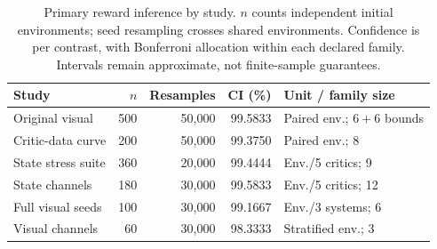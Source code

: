 \begin{table}[tb]\centering\small
\caption{Primary reward inference by study. $n$ counts independent initial environments; seed resampling crosses shared environments. Confidence is per contrast, with Bonferroni allocation within each declared family. Intervals remain approximate, not finite-sample guarantees.}\label{tab:inference}
\setlength{\tabcolsep}{3pt}
\begin{tabular}{lrrrl}\toprule Study & $n$ & Resamples & CI (\%) & Unit / family size\\\midrule
Original visual & 500 & 50,000 & 99.5833 & Paired env.; $6+6$ bounds\\
Critic-data curve & 200 & 50,000 & 99.3750 & Paired env.; 8\\
State stress suite & 360 & 20,000 & 99.4444 & Env./5 critics; 9\\
State channels & 180 & 30,000 & 99.5833 & Env./5 critics; 12\\
Full visual seeds & 100 & 30,000 & 99.1667 & Env./3 systems; 6\\
Visual channels & 60 & 30,000 & 98.3333 & Stratified env.; 3\\\bottomrule
\end{tabular}
\end{table}
